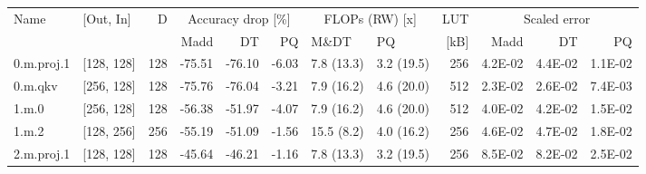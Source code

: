 \begin{table}
\centering
\begin{tabular}{llrrrrllrrrr}
\toprule
Name & [Out, In] & D & \multicolumn{3}{|c|}{Accuracy drop [\%]} & \multicolumn{2}{|c|}{FLOPs (RW) [x]} & LUT & \multicolumn{3}{|c|}{Scaled error} \\
 &  &  & Madd & DT & PQ & M\&DT & PQ & [kB] & Madd & DT & PQ \\
\midrule
0.m.proj.1 & [128, 128] & 128 & {\cellcolor[HTML]{A70226}} \color[HTML]{F1F1F1} -75.51 & {\cellcolor[HTML]{A50026}} \color[HTML]{F1F1F1} -76.10 & {\cellcolor[HTML]{FAFDB8}} \color[HTML]{000000} -6.03 & 7.8 (13.3) & 3.2 (19.5) & 256 & {\cellcolor[HTML]{ECF7A6}} \color[HTML]{000000} 4.2E-02 & {\cellcolor[HTML]{EFF8AA}} \color[HTML]{000000} 4.4E-02 & {\cellcolor[HTML]{BFE47A}} \color[HTML]{000000} 1.1E-02 \\
0.m.qkv & [256, 128] & 128 & {\cellcolor[HTML]{A70226}} \color[HTML]{F1F1F1} -75.76 & {\cellcolor[HTML]{A50026}} \color[HTML]{F1F1F1} -76.04 & {\cellcolor[HTML]{F2FAAE}} \color[HTML]{000000} -3.21 & 7.9 (16.2) & 4.6 (20.0) & 512 & {\cellcolor[HTML]{D3EC87}} \color[HTML]{000000} 2.3E-02 & {\cellcolor[HTML]{D7EE8A}} \color[HTML]{000000} 2.6E-02 & {\cellcolor[HTML]{B9E176}} \color[HTML]{000000} 7.4E-03 \\
1.m.0 & [256, 128] & 128 & {\cellcolor[HTML]{E44C34}} \color[HTML]{F1F1F1} -56.38 & {\cellcolor[HTML]{ED5F3C}} \color[HTML]{F1F1F1} -51.97 & {\cellcolor[HTML]{F5FBB2}} \color[HTML]{000000} -4.07 & 7.9 (16.2) & 4.6 (20.0) & 512 & {\cellcolor[HTML]{EBF7A3}} \color[HTML]{000000} 4.0E-02 & {\cellcolor[HTML]{EEF8A8}} \color[HTML]{000000} 4.2E-02 & {\cellcolor[HTML]{C5E67E}} \color[HTML]{000000} 1.5E-02 \\
1.m.2 & [128, 256] & 256 & {\cellcolor[HTML]{E65036}} \color[HTML]{F1F1F1} -55.19 & {\cellcolor[HTML]{EF633F}} \color[HTML]{F1F1F1} -51.09 & {\cellcolor[HTML]{EEF8A8}} \color[HTML]{000000} -1.56 & 15.5 (8.2) & 4.0 (16.2) & 256 & {\cellcolor[HTML]{F2FAAE}} \color[HTML]{000000} 4.6E-02 & {\cellcolor[HTML]{F4FAB0}} \color[HTML]{000000} 4.7E-02 & {\cellcolor[HTML]{CBE982}} \color[HTML]{000000} 1.8E-02 \\
2.m.proj.1 & [128, 128] & 128 & {\cellcolor[HTML]{F67C4A}} \color[HTML]{F1F1F1} -45.64 & {\cellcolor[HTML]{F67A49}} \color[HTML]{F1F1F1} -46.21 & {\cellcolor[HTML]{ECF7A6}} \color[HTML]{000000} -1.16 & 7.8 (13.3) & 3.2 (19.5) & 256 & {\cellcolor[HTML]{FEE08B}} \color[HTML]{000000} 8.5E-02 & {\cellcolor[HTML]{FEE28F}} \color[HTML]{000000} 8.2E-02 & {\cellcolor[HTML]{D7EE8A}} \color[HTML]{000000} 2.5E-02 \\

\end{tabular}
\end{table}
